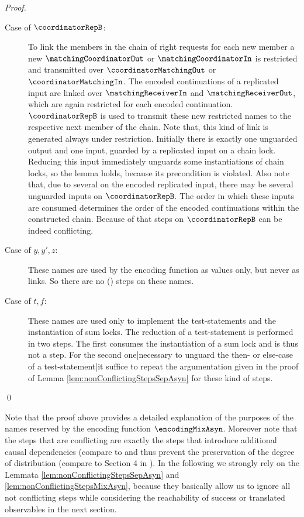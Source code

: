 \documentclass[]{llncs}
\begin{document}
\begin{proof}
\begin{description}
		\item[Case of $ \coordinatorRepB $:] To link the members in the chain of right requests for each new member a new $ \matchingCoordinatorOut $ or $ \matchingCoordinatorIn $ is restricted and transmitted over $ \coordinatorMatchingOut $ or $ \coordinatorMatchingIn $. The encoded continuations of a replicated input are linked over $ \matchingReceiverIn $ and $ \matchingReceiverOut $, which are again restricted for each encoded continuation. $ \coordinatorRepB $ is used to transmit these new restricted names to the respective next member of the chain. Note that, this kind of link is generated always under restriction. Initially there is exactly one unguarded output and one input, guarded by a replicated input on a chain lock. Reducing this input immediately unguards some instantiations of chain locks, so the lemma holds, because its precondition is violated. Also note that, due to several \simulations on the encoded replicated input, there may be several unguarded inputs on $ \coordinatorRepB $. The order in which these inputs are consumed determines the order of the encoded continuations within the constructed chain. Because of that steps on $ \coordinatorRepB $ can be indeed conflicting.
		\item[Case of $ y, y', z $:] These names are used by the encoding function as values only, but never as links. So there are no (\pure \admin) steps on these names.
		\item[Case of $ t, f $:] These names are used only to implement the test-statements and the instantiation of sum locks. The reduction of a test-statement is performed in two steps. The first consumes the instantiation of a sum lock and is thus not a \pure \admin step. For the second one|necessary to unguard the then- or else-case of a test-statement|it suffice to repeat the argumentation given in the proof of Lemma \ref{lem:nonConflictingStepsSepAsyn} for these kind of steps.
	\end{description}
	\qed
\end{proof}

Note that the proof above provides a detailed explanation of the purposes of the names reserved by the encoding function $ \encodingMixAsyn $. Moreover note that the \pure \admin steps that are conflicting are exactly the steps that introduce additional causal dependencies (compare to \cite{petersSchickeNestmann11} and thus prevent the preservation of the degree of distribution (compare to Section 4 in \cite{petersNestmann12}). In the following we strongly rely on the Lemmata \ref{lem:nonConflictingStepsSepAsyn} and \ref{lem:nonConflictingStepsMixAsyn}, because they basically allow us to ignore all not conflicting steps while considering the reachability of success or translated observables in the next section.
\end{document}
